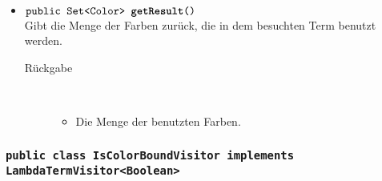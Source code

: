 \begin{description}
\begin{itemize}
		\item $\texttt{public Set<Color> \textbf{getResult}()}$ \\ Gibt die Menge der Farben zurück, die in dem besuchten Term benutzt werden.
		\begin{description}
			\item[Rückgabe] \hfill \\
			\vspace{-.8cm}
			\begin{itemize}
				\item Die Menge der benutzten Farben.
			\end{itemize}
		\end{description}
	\end{itemize}
\end{description}

\subsubsection{\normalfont \texttt{public class \textbf{IsColorBoundVisitor} implements LambdaTermVisitor<Boolean>}}

